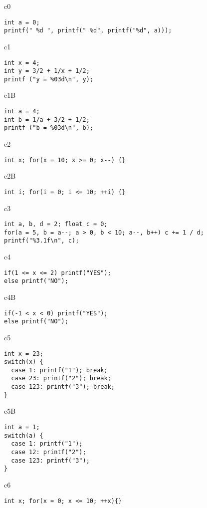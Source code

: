 
\begin{chunk}{c0}
\begin{verbatim}
int a = 0; 
printf(" %d ", printf(" %d", printf("%d", a)));
\end{verbatim}
\end{chunk}

\begin{chunk}{c1}
\begin{verbatim}
int x = 4;
int y = 3/2 + 1/x + 1/2;
printf ("y = %03d\n", y);
\end{verbatim}
\end{chunk}

\begin{chunk}{c1B}
\begin{verbatim}
int a = 4;
int b = 1/a + 3/2 + 1/2;
printf ("b = %03d\n", b);
\end{verbatim}
\end{chunk}

\begin{chunk}{c2}
\begin{verbatim}
int x; for(x = 10; x >= 0; x--) {} 
\end{verbatim}
\end{chunk}

\begin{chunk}{c2B}
\begin{verbatim}
int i; for(i = 0; i <= 10; ++i) {} 
\end{verbatim}
\end{chunk}

\begin{chunk}{c3}
\begin{verbatim}
int a, b, d = 2; float c = 0;
for(a = 5, b = a--; a > 0, b < 10; a--, b++) c += 1 / d;
printf("%3.1f\n", c);
\end{verbatim}
\end{chunk}

\begin{chunk}{c4}
\begin{verbatim}
if(1 <= x <= 2) printf("YES");
else printf("NO");
\end{verbatim}
\end{chunk}

\begin{chunk}{c4B}
\begin{verbatim}
if(-1 < x < 0) printf("YES");
else printf("NO");
\end{verbatim}
\end{chunk}


\begin{chunk}{c5}
\begin{verbatim}
int x = 23;
switch(x) {
  case 1: printf("1"); break;
  case 23: printf("2"); break;
  case 123: printf("3"); break;
}
\end{verbatim}
\end{chunk}

\begin{chunk}{c5B}
\begin{verbatim}
int a = 1;
switch(a) {
  case 1: printf("1");
  case 12: printf("2");
  case 123: printf("3");
}
\end{verbatim}
\end{chunk}

\begin{chunk}{c6}
\begin{verbatim}
int x; for(x = 0; x <= 10; ++x){}
\end{verbatim}
\end{chunk}

